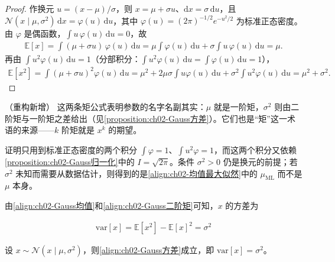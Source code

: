 \documentclass[../../main.tex]{subfiles}
\begin{document}
\begin{proof}
作换元 $u=(x-\mu)/\sigma$，则 $x=\mu+\sigma u$、$\mathrm{d}x=\sigma\,\mathrm{d}u$，且 $\mathcal{N}(x\mid\mu,\sigma^{2})\,\mathrm{d}x=\varphi(u)\,\mathrm{d}u$，其中 $\varphi(u)=(2\pi)^{-1/2}e^{-u^{2}/2}$ 为标准正态密度。由 $\varphi$ 是偶函数，$\int u\,\varphi(u)\,\mathrm{d}u=0$，故
\begin{align*}
  \mathbb{E}[x] = \int(\mu+\sigma u)\,\varphi(u)\,\mathrm{d}u = \mu\int\varphi(u)\,\mathrm{d}u + \sigma\int u\,\varphi(u)\,\mathrm{d}u = \mu .
\end{align*}
再由 $\int u^{2}\varphi(u)\,\mathrm{d}u=1$（分部积分：$\int u^{2}\varphi(u)\,\mathrm{d}u=\int\varphi(u)\,\mathrm{d}u=1$），
\begin{align*}
  \mathbb{E}[x^{2}] = \int(\mu+\sigma u)^{2}\varphi(u)\,\mathrm{d}u
  = \mu^{2} + 2\mu\sigma\int u\varphi(u)\,\mathrm{d}u + \sigma^{2}\int u^{2}\varphi(u)\,\mathrm{d}u = \mu^{2}+\sigma^{2} .
\end{align*}
\end{proof}

\begin{remark}（重构新增）
这两条矩公式表明参数的名字名副其实：$\mu$ 就是一阶矩，$\sigma^{2}$ 则由二阶矩与一阶矩之差给出（见\cref{proposition:ch02-Gauss方差}）。它们也是“矩”这一术语的来源——$k$ 阶矩就是 $x^{k}$ 的期望。

证明只用到标准正态密度的两个积分 $\int\varphi=1$、$\int u^{2}\varphi=1$，而这两个积分又依赖\cref{proposition:ch02-Gauss归一化}中的 $I=\sqrt{2\pi}$。条件 $\sigma^{2}>0$ 仍是换元的前提；若 $\sigma^{2}$ 未知而需要从数据估计，则得到的是\eqref{align:ch02-均值最大似然}中的 $\mu_{\mathrm{ML}}$ 而不是 $\mu$ 本身。
\end{remark}

由\eqref{align:ch02-Gauss均值}和\eqref{align:ch02-Gauss二阶矩}可知，$x$ 的方差为

\begin{align}
  \mathrm{var}[x] = \mathbb{E}\left[x^{2}\right] - \mathbb{E}[x]^{2} = \sigma^{2}
  \label{align:ch02-Gauss方差}
\end{align}

\begin{proposition}\label{proposition:ch02-Gauss方差}
设 $x\sim\mathcal{N}(x\mid\mu,\sigma^{2})$，则\eqref{align:ch02-Gauss方差}成立，即 $\mathrm{var}[x]=\sigma^{2}$。
\end{proposition}
\end{document}
